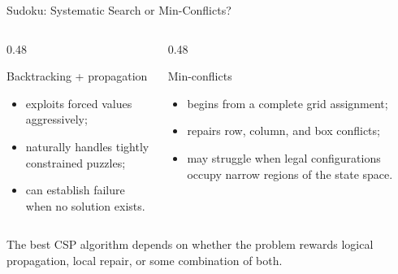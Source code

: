 \documentclass[aspectratio=169,10pt]{beamer}
\begin{document}
\begin{frame}[shrink=20]{Sudoku: Systematic Search or Min-Conflicts?}
  \begin{columns}[T,onlytextwidth]
    \begin{column}{0.48\textwidth}
      \begin{block}{Backtracking + propagation}
        \begin{itemize}
          \item exploits forced values aggressively;
          \item naturally handles tightly constrained puzzles;
          \item can establish failure when no solution exists.
        \end{itemize}
      \end{block}
    \end{column}

    \begin{column}{0.48\textwidth}
      \begin{block}{Min-conflicts}
        \begin{itemize}
          \item begins from a complete grid assignment;
          \item repairs row, column, and box conflicts;
          \item may struggle when legal configurations occupy narrow regions of the state space.
        \end{itemize}
      \end{block}
    \end{column}
  \end{columns}

  \begin{keyidea}
    The best CSP algorithm depends on whether the problem rewards logical propagation, local repair, or some combination of both.
  \end{keyidea}
\end{frame}

\end{document}
